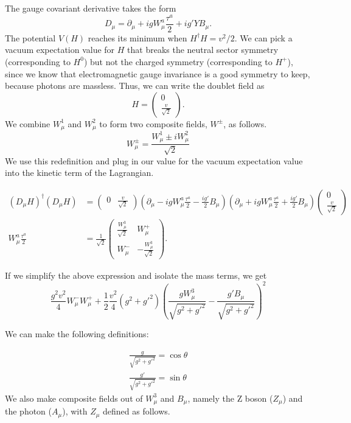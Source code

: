 The gauge covariant derivative takes the form
$$D_\mu = \partial_\mu + igW_\mu^a\frac{\tau^a}{2}+ig'YB_\mu.$$
The potential $V(H)$ reaches its minimum when $H^\dag H = v^2 / 2$. We can pick a vacuum expectation value for $H$ that breaks the neutral sector symmetry (corresponding to $H^0$) but not the charged symmetry (corresponding to $H^{+}$), since we know that electromagnetic gauge invariance is a good symmetry to keep, because photons are massless. Thus, we can write the doublet field as
$$H = \left(\begin{array}{c}0\\\frac{v}{\sqrt{2}}\end{array}\right).$$
We combine $W_\mu^1$ and $W_\mu^2$ to form two composite fields, $W^\pm$, as follows.
$$W_\mu^\pm = \frac{W_\mu^1\pm iW_\mu^2}{\sqrt{2}}$$
We use this redefinition and plug in our value for the vacuum expectation value into the kinetic term of the Lagrangian.

\begin{align*}
  (D_\mu H)^\dag(D_\mu H) &= (\begin{array}{cc} 0 & \frac{v}{\sqrt{2}}\end{array})
  \left(\partial_\mu - igW_\mu^a\frac{\tau^a}{2}
  -\frac{ig'}{2}B_\mu\right)
  \left(\partial_\mu+igW_\mu^a\frac{\tau^a}{2}+\frac{ig'}{2}B_\mu\right)
  \left(\begin{array}{c}0\\\frac{v}{\sqrt{2}}\end{array}\right)\\
  W_\mu^a\frac{\tau^a}{2} &= 
  \frac{1}{\sqrt{2}}
  \left(\begin{array}{cc}
    \frac{W_\mu^3}{\sqrt{2}} & W_\mu^+\\
    W_\mu^- & -\frac{W_\mu^3}{\sqrt{2}}
  \end{array}\right).
\end{align*}

If we simplify the above expression and isolate the mass terms, we get
\[\frac{g^2v^2}{4}W_\mu^-W_\mu^++\frac{1}{2}\frac{v^2}{4}(g^2+g'^2)
\left(\frac{gW_\mu^3}{\sqrt{g^2+g'^2}}-\frac{g'B_\mu}{\sqrt{g^2+g'^2}}\right)^2\]

We can make the following definitions:

\begin{align*}
  \frac{g}{\sqrt{g^2+g'^2}} = \cos\theta\\
  \frac{g'}{\sqrt{g^2+g'^2}} = \sin\theta
\end{align*}
We also make composite fields out of $W_\mu^3$ and $B_\mu$, namely the Z boson ($Z_\mu$) and the photon ($A_\mu$), with $Z_\mu$ defined as follows.

